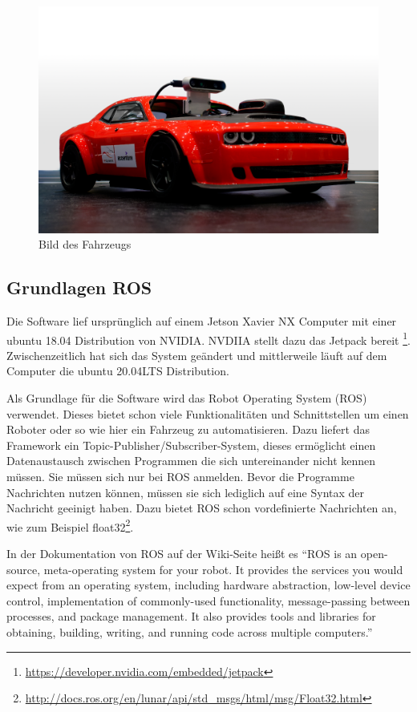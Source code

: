 \begin{figure}
  \begin{center}
  
    \includegraphics[width=\textwidth]{bilder/VDI-Racer.png}
  \caption{Bild des Fahrzeugs}
  \label{fig:vehicle}
  \end{center}
\end{figure}

\subsection{Grundlagen ROS}
\label{sec:grundlagen-ROS}
Die Software lief ursprünglich auf einem Jetson Xavier NX Computer mit einer ubuntu 18.04 Distribution von NVIDIA. NVDIIA stellt dazu das Jetpack bereit \footnote{\url{https://developer.nvidia.com/embedded/jetpack}}. Zwischenzeitlich hat sich das System geändert und mittlerweile läuft auf dem Computer die ubuntu 20.04LTS Distribution. 

Als Grundlage für die Software wird das Robot Operating System (ROS) verwendet. Dieses bietet schon viele Funktionalitäten und Schnittstellen um einen Roboter oder so wie hier ein Fahrzeug zu automatisieren. Dazu liefert das Framework ein Topic-Publisher/Subscriber-System, dieses ermöglicht einen Datenaustausch zwischen Programmen die sich untereinander nicht kennen müssen. Sie müssen sich nur bei ROS anmelden. Bevor die Programme Nachrichten nutzen können, müssen sie sich lediglich auf eine Syntax der Nachricht geeinigt haben. Dazu bietet ROS schon vordefinierte Nachrichten an, wie zum Beispiel float32\footnote{\url{http://docs.ros.org/en/lunar/api/std_msgs/html/msg/Float32.html}}. 

In der Dokumentation von ROS auf der Wiki-Seite heißt es ``ROS is an open-source, meta-operating system for your robot. It provides the services you would expect from an operating system, including hardware abstraction, low-level device control, implementation of commonly-used functionality, message-passing between processes, and package management. It also provides tools and libraries for obtaining, building, writing, and running code across multiple computers.''
\cite{ROS-Wiki}

